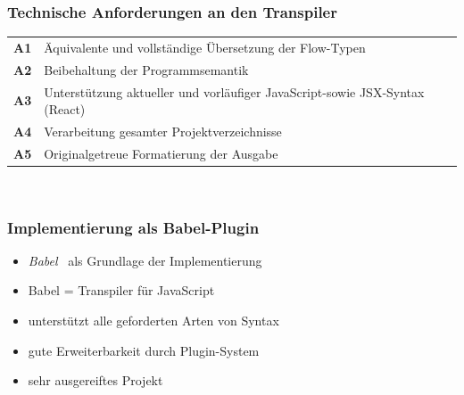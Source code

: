     \begin{frame}
      \frametitle{Technische Anforderungen an den Transpiler}
      {
        \renewcommand{\arraystretch}{1.4}
        \begin{tabu} to 
          \textbf{A1} & Äquivalente und vollständige Übersetzung der Flow-Typen \\
          \textbf{A2} & Beibehaltung der Programmsemantik \\
          \textbf{A3} & Unterstützung aktueller und vorläufiger\footnotemark{} JavaScript-\newline sowie JSX-Syntax (React) \\
          \textbf{A4} & Verarbeitung gesamter Projektverzeichnisse \\
          \textbf{A5} & Originalgetreue Formatierung der Ausgabe \\
        \end{tabu}
        \\[0.75em]
      }

    \end{frame}


    \begin{frame}
      \frametitle{Implementierung als Babel-Plugin}
      \begin{itemize}
        \item \textit{Babel}~\autocite{BABEL} als Grundlage der Implementierung
        \item Babel = Transpiler für JavaScript
        \item unterstützt alle geforderten Arten von Syntax
        \item gute Erweiterbarkeit durch Plugin-System
        \item sehr ausgereiftes Projekt
      \end{itemize}
    \end{frame}

